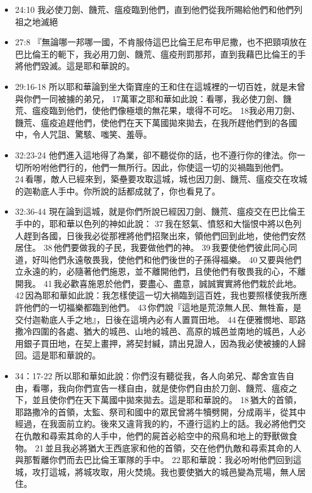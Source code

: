 \begin{itemize}
\item 24:10
我必使刀劍、饑荒、瘟疫臨到他們，直到他們從我所賜給他們和他們列祖之地滅絕

\item 27:8
『無論哪一邦哪一國，不肯服侍這巴比倫王尼布甲尼撒，也不把頸項放在巴比倫王的軛下，我必用刀劍、饑荒、瘟疫刑罰那邦，直到我藉巴比倫王的手將他們毀滅。這是耶和華說的。

\item 29:16-18 
所以耶和華論到坐大衛寶座的王和住在這城裡的一切百姓，就是未曾與你們一同被擄的弟兄， 17萬軍之耶和華如此說：看哪，我必使刀劍、饑荒、瘟疫臨到他們，使他們像極壞的無花果，壞得不可吃。 18我必用刀劍、饑荒、瘟疫追趕他們，使他們在天下萬國拋來拋去，在我所趕他們到的各國中，令人咒詛、驚駭、嗤笑、羞辱。

\item 32:23-24
他們進入這地得了為業，卻不聽從你的話，也不遵行你的律法。你一切所吩咐他們行的，他們一無所行。因此，你使這一切的災禍臨到他們。 24 看哪，敵人已經來到，築壘要攻取這城，城也因刀劍、饑荒、瘟疫交在攻城的迦勒底人手中。你所說的話都成就了，你也看見了。

\item 32:36-44 現在論到這城，就是你們所說已經因刀劍、饑荒、瘟疫交在巴比倫王手中的，耶和華以色列的神如此說： 37 我在怒氣、憤怒和大惱恨中將以色列人趕到各國，日後我必從那裡將他們招聚出來，領他們回到此地，使他們安然居住。 38 他們要做我的子民，我要做他們的神。 39 我要使他們彼此同心同道，好叫他們永遠敬畏我，使他們和他們後世的子孫得福樂。 40 又要與他們立永遠的約，必隨著他們施恩，並不離開他們，且使他們有敬畏我的心，不離開我。 41 我必歡喜施恩於他們，要盡心、盡意，誠誠實實將他們栽於此地。 42 因為耶和華如此說：我怎樣使這一切大禍臨到這百姓，我也要照樣使我所應許他們的一切福樂都臨到他們。 43 你們說『這地是荒涼無人民、無牲畜，是交付迦勒底人手之地』，日後在這境內必有人置買田地。 44 在便雅憫地、耶路撒冷四圍的各處、猶大的城邑、山地的城邑、高原的城邑並南地的城邑，人必用銀子買田地，在契上畫押，將契封緘，請出見證人，因為我必使被擄的人歸回。這是耶和華說的。

\item 34：17-22 所以耶和華如此說：你們沒有聽從我，各人向弟兄、鄰舍宣告自由，看哪，我向你們宣告一樣自由，就是使你們自由於刀劍、饑荒、瘟疫之下，並且使你們在天下萬國中拋來拋去。這是耶和華說的。 18 猶大的首領，耶路撒冷的首領，太監、祭司和國中的眾民曾將牛犢劈開，分成兩半，從其中經過，在我面前立約。後來又違背我的約，不遵行這約上的話。我必將他們交在仇敵和尋索其命的人手中，他們的屍首必給空中的飛鳥和地上的野獸做食物。 21 並且我必將猶大王西底家和他的首領，交在他們仇敵和尋索其命的人與那暫離你們而去巴比倫王軍隊的手中。 22 耶和華說：我必吩咐他們回到這城，攻打這城，將城攻取，用火焚燒。我也要使猶大的城邑變為荒場，無人居住。


\end{itemize}
